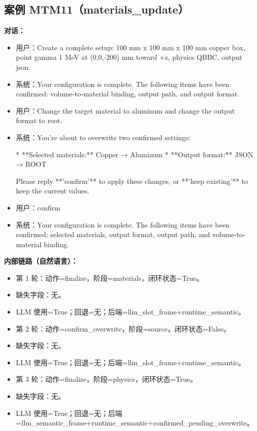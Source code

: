 \documentclass[11pt]{ctexart}
\begin{document}
\subsection{案例 MTM11（materials\_update）}
\textbf{对话：}
\begin{itemize}
\item 用户：Create a complete setup: 100 mm x 100 mm x 100 mm copper box, point gamma 1 MeV at (0,0,-200) mm toward +z, physics QBBC, output json.
\item 系统：Your configuration is complete. The following items have been confirmed: volume-to-material binding, output path, and output format.
\item 用户：Change the target material to aluminum and change the output format to root.
\item 系统：You're about to overwrite two confirmed settings:

*   **Selected materials:** Copper → Aluminum
*   **Output format:** JSON → ROOT

Please reply **'confirm'** to apply these changes, or **'keep existing'** to keep the current values.
\item 用户：confirm
\item 系统：Your configuration is complete. The following items have been confirmed: selected materials, output format, output path, and volume-to-material binding.
\end{itemize}
\textbf{内部链路（自然语言）：}
\begin{itemize}
\item 第 1 轮：动作=finalize，阶段=materials，闭环状态=True。
\item 缺失字段：无。
\item LLM 使用=True；回退=无；后端=llm\_slot\_frame+runtime\_semantic。
\item 第 2 轮：动作=confirm\_overwrite，阶段=source，闭环状态=False。
\item 缺失字段：无。
\item LLM 使用=True；回退=无；后端=llm\_slot\_frame+runtime\_semantic。
\item 第 3 轮：动作=finalize，阶段=physics，闭环状态=True。
\item 缺失字段：无。
\item LLM 使用=True；回退=无；后端=llm\_semantic\_frame+runtime\_semantic+confirmed\_pending\_overwrite。
\end{itemize}
\end{document}
